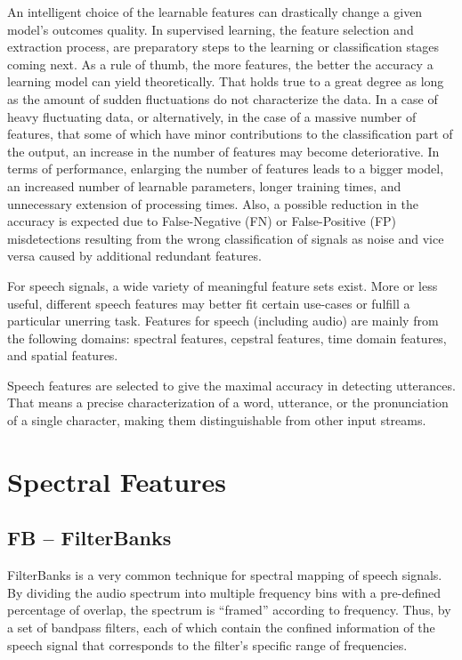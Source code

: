 An intelligent choice of the learnable features 
\cite{7845025} 
can drastically change a given model's outcomes quality.
In supervised learning, the 
feature selection and extraction process,
are preparatory steps to the learning or classification
stages coming next.
As a rule of thumb, the more features, the better the accuracy
a learning model can yield theoretically\cite{lessIsMore}.
That holds true to a great degree
as long as the amount of sudden fluctuations do not characterize the data.
In a case of heavy fluctuating data,
or alternatively, in the case of a 
massive number of features, 
that some of which have minor contributions 
to the classification part of the output,
an increase in the number of features may become deteriorative.
In terms of performance, 
enlarging the number of features leads to a bigger model, 
an increased number of learnable parameters, 
longer training times, 
and unnecessary extension of processing times.
Also, a possible reduction in the accuracy is 
expected due to 
False-Negative (FN) or False-Positive (FP) 
misdetections resulting from the wrong 
classification of signals as noise and 
vice versa caused by additional redundant features.

For speech signals, a wide variety of 
meaningful feature sets exist. 
More or less useful, different speech features 
may better fit certain use-cases or fulfill 
a particular unerring task. 
Features for speech (including audio) 
are mainly from the following domains: spectral features,
cepstral features, time domain features, and spatial features.

Speech features are selected 
to give the maximal accuracy in detecting utterances.
That means a precise characterization of a 
word, utterance, or the pronunciation of 
a single character, making them distinguishable
from other input streams. 

\section{Spectral Features}
\subsection{FB -- FilterBanks}
FilterBanks is a very common technique
for spectral mapping of speech signals.
By dividing the audio spectrum into multiple 
frequency bins with a pre-defined percentage of overlap, 
the spectrum is 
``framed'' according to frequency. 
Thus, by a set of bandpass filters,
each of which contain the confined 
information of the speech signal 
that corresponds to the filter's specific 
range of frequencies.

